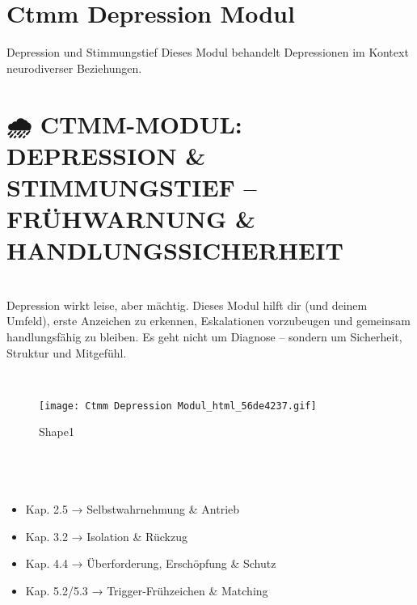 
\section{Ctmm Depression Modul}
\label{sec:ctmm-depression-modul}


\begin{ctmmBlueBox}{Depression und Stimmungstief}
Dieses Modul behandelt Depressionen im Kontext neurodiverser Beziehungen.
\end{ctmmBlueBox}

\hypertarget{ctmm-modul-depression-stimmungstief-fruxfchwarnung-handlungssicherheit}{%
\section[ 🌧️ CTMM-MODUL: DEPRESSION \& STIMMUNGSTIEF -- FRÜHWARNUNG \& HANDLUNGSSICHERHEIT]{\texorpdfstring{\protect\hypertarget{Xa9bae9064450c0f15fab2a0092a121ce07fe561}{}{} 🌧️ CTMM-MODUL: DEPRESSION \& STIMMUNGSTIEF -- FRÜHWARNUNG \& HANDLUNGSSICHERHEIT}{ 🌧️ CTMM-MODUL: DEPRESSION \& STIMMUNGSTIEF -- FRÜHWARNUNG \& HANDLUNGSSICHERHEIT}}\label{ctmm-modul-depression-stimmungstief-fruxfchwarnung-handlungssicherheit}}

🧠 \textbf{\textcolor{ctmmBlue}{\1}}\\
Depression wirkt leise, aber mächtig. Dieses Modul hilft dir (und deinem Umfeld), erste Anzeichen zu erkennen, Eskalationen vorzubeugen und gemeinsam handlungsfähig zu bleiben. Es geht nicht um Diagnose -- sondern um Sicherheit, Struktur und Mitgefühl.

🧩 \textcolor{ctmmGreen}{\textit{\1}}

\begin{figure}
\hypertarget{Shape1}{%
\centering
\texttt{[image: Ctmm Depression Modul\_html\_56de4237.gif]}
\caption{Shape1}\label{Shape1}
}
\end{figure}

\hypertarget{kapitelzuordnung-im-ctmm-system}{%
\subsection{\textcolor{ctmmBlue}{\faBook~\1}}\label{kapitelzuordnung-im-ctmm-system}}

\begin{itemize}[label=\textcolor{ctmmOrange}{\faArrowRight}]
\item
  Kap. 2.5 → Selbstwahrnehmung \& Antrieb
\item
  Kap. 3.2 → Isolation \& Rückzug
\item
  Kap. 4.4 → Überforderung, Erschöpfung \& Schutz
\item
  Kap. 5.2/5.3 → Trigger-Frühzeichen \& Matching
\end{itemize}

